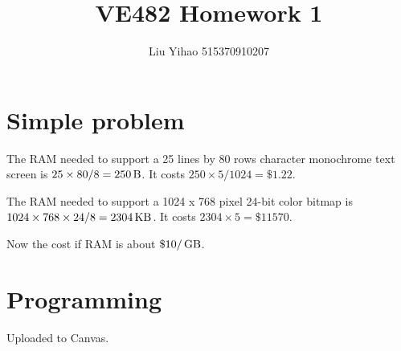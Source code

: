 \documentclass{article}
\title{VE482 Homework 1}
\author{Liu Yihao 515370910207}
\date{}
\newcommand{\unit}[1]{{\rm\,#1}}
\begin{document}
\maketitle

\section{Simple problem}
The RAM needed to support a 25 lines by 80 rows character monochrome text screen is $25\times80/8=250\unit{B}$. It costs  $250\times5/1024=\$ 1.22$.

The RAM needed to support a 1024 x 768 pixel 24-bit color bitmap is $1024\times768\times24/8=2304\unit{KB}$. It costs $2304\times5=\$ 11570$.

Now the cost if RAM is about $\$10/\unit{GB}$.

\section{Programming}
Uploaded to Canvas.
\end{document}
